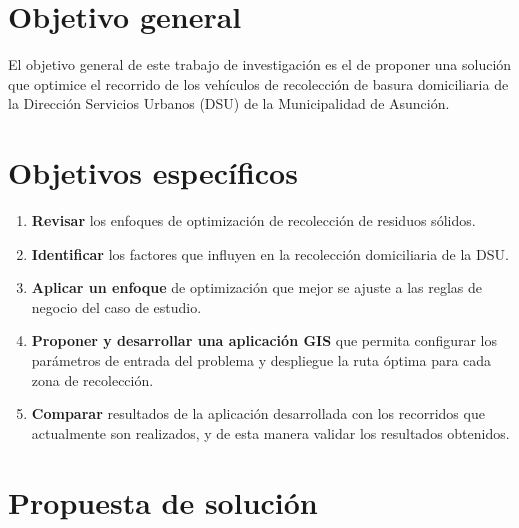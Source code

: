 \documentclass[a0,portrait, final]{a0poster}
\begin{document}
\begin{multicols}{2}



\section*{Objetivo general}
El objetivo general de este trabajo de investigación es el de proponer una solución que optimice el recorrido de los vehículos de recolección de basura domiciliaria de la Dirección Servicios Urbanos (DSU) de la Municipalidad de Asunción.

\section*{Objetivos específicos}
\begin{enumerate}
    \item \textbf{Revisar} los enfoques de optimización de recolección de residuos sólidos.
    \item \textbf{Identificar} los factores que influyen en la recolección domiciliaria de la DSU.
    \item \textbf{Aplicar un enfoque} de optimización que mejor se ajuste a las reglas de negocio del caso de estudio.
    \item \textbf{Proponer y desarrollar una aplicación GIS} que permita configurar los parámetros de entrada del problema y despliegue la ruta óptima para cada zona de recolección.
    \item \textbf{Comparar} resultados de la aplicación desarrollada con los recorridos que actualmente son realizados, y de esta manera validar los resultados obtenidos.
\end{enumerate}



\section*{Propuesta de solución}


\end{multicols}
\end{document}
